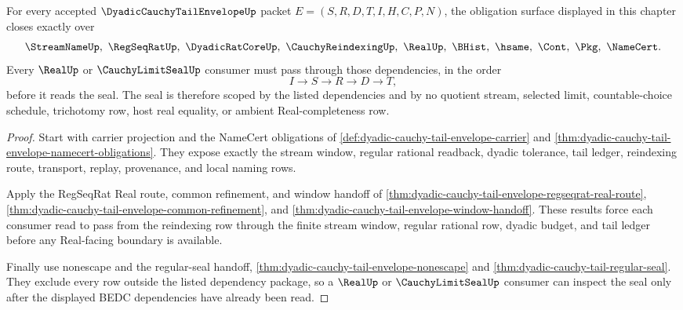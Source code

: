 \begin{theorem}
\label{thm:dyadic-cauchy-tail-envelope-scoped-dependency-package}
For every accepted $\DyadicCauchyTailEnvelopeUp$ packet $E=(S,R,D,T,I,H,C,P,N)$, the obligation surface displayed in this chapter closes exactly over
$$
\StreamNameUp,\ \RegSeqRatUp,\ \DyadicRatCoreUp,\ \CauchyReindexingUp,\ \RealUp,\ \BHist,\ \hsame,\ \Cont,\ \Pkg,\ \NameCert .
$$
Every $\RealUp$ or $\CauchyLimitSealUp$ consumer must pass through those dependencies, in the order
$$
I \longrightarrow S \longrightarrow R \longrightarrow D \longrightarrow T ,
$$
before it reads the seal. The seal is therefore scoped by the listed dependencies and by no quotient stream, selected limit, countable-choice schedule, trichotomy row, host real equality, or ambient Real-completeness row.
\end{theorem}
\begin{proof}
Start with carrier projection and the NameCert obligations of \autoref{def:dyadic-cauchy-tail-envelope-carrier} and \autoref{thm:dyadic-cauchy-tail-envelope-namecert-obligations}. They expose exactly the stream window, regular rational readback, dyadic tolerance, tail ledger, reindexing route, transport, replay, provenance, and local naming rows.

Apply the RegSeqRat Real route, common refinement, and window handoff of \autoref{thm:dyadic-cauchy-tail-envelope-regseqrat-real-route}, \autoref{thm:dyadic-cauchy-tail-envelope-common-refinement}, and \autoref{thm:dyadic-cauchy-tail-envelope-window-handoff}. These results force each consumer read to pass from the reindexing row through the finite stream window, regular rational row, dyadic budget, and tail ledger before any Real-facing boundary is available.

Finally use nonescape and the regular-seal handoff, \autoref{thm:dyadic-cauchy-tail-envelope-nonescape} and \autoref{thm:dyadic-cauchy-tail-regular-seal}. They exclude every row outside the listed dependency package, so a $\RealUp$ or $\CauchyLimitSealUp$ consumer can inspect the seal only after the displayed BEDC dependencies have already been read.
\end{proof}

